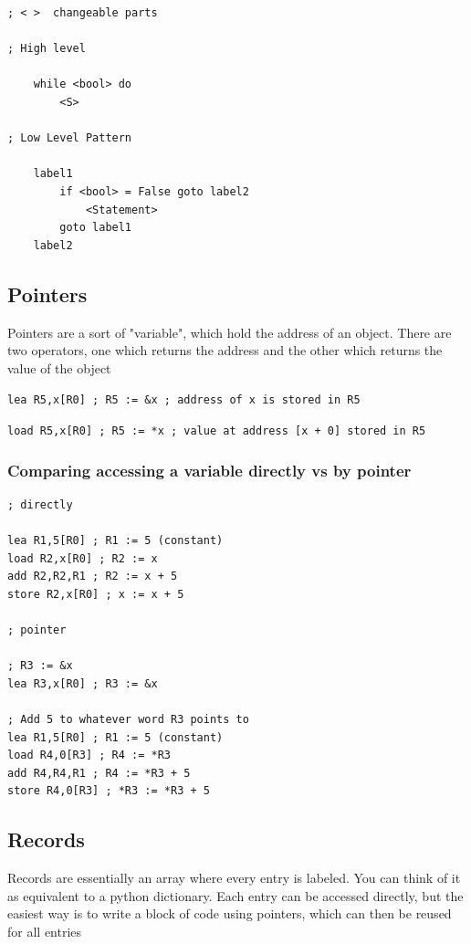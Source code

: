 \documentclass[english,course]{Notes}
\newcommand{\code}{\texttt}
\begin{document}

\begin{lstlisting}
; < >  changeable parts

; High level

    while <bool> do
    	<S>
	
; Low Level Pattern

	label1
	    if <bool> = False goto label2
	    	<Statement>
		goto label1
	label2
\end{lstlisting}

\subsection{Pointers}

\par{Pointers are a sort of "variable", which hold the address of an object. There are two operators, one which returns the address and the other which returns the value of the object}


\code{lea R5,x[R0] ; R5 := \&x ; address of x is stored in R5}

\code{load R5,x[R0] ; R5 := *x ; value at address [x + 0] stored in R5}

\subsubsection{Comparing accessing a variable directly vs by pointer}

\begin{lstlisting}
; directly

lea R1,5[R0] ; R1 := 5 (constant)
load R2,x[R0] ; R2 := x
add R2,R2,R1 ; R2 := x + 5
store R2,x[R0] ; x := x + 5

; pointer

; R3 := &x
lea R3,x[R0] ; R3 := &x

; Add 5 to whatever word R3 points to
lea R1,5[R0] ; R1 := 5 (constant)
load R4,0[R3] ; R4 := *R3
add R4,R4,R1 ; R4 := *R3 + 5
store R4,0[R3] ; *R3 := *R3 + 5
\end{lstlisting}

\subsection{Records}

\par{Records are essentially an array where every entry is labeled. You can think of it as equivalent to a python dictionary. Each entry can be accessed directly, but the easiest way is to write a block of code using pointers, which can then be reused for all entries}
\end{document}
